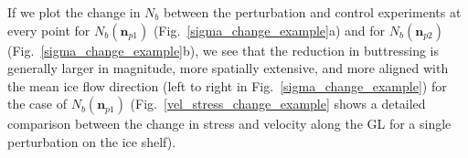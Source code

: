 \documentclass[review,oneside]{igs}
\begin{document}
If we plot the change in $N_b$ between the perturbation and control experiments at every point for $N_b(\mathbf{n}_{p1})$ (Fig.~\ref{sigma_change_example}a) and for $N_b(\mathbf{n}_{p2})$ (Fig.~\ref{sigma_change_example}b), we see that the reduction in buttressing is generally larger in magnitude, more spatially extensive, and more aligned with the mean ice flow direction (left to right in Fig.~\ref{sigma_change_example}) for the case of $N_b(\mathbf{n}_{p1})$ (Fig.~\ref{vel_stress_change_example} shows a detailed comparison between the change in stress and velocity along the GL for a single perturbation on the ice shelf). 


\end{document}

